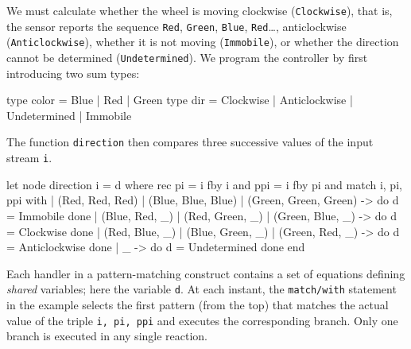 \documentclass[11pt,titlepage,twoside]{report}
\makeatletter
\newcommand{\zls}[1]{{\@span{class="zelusinline"}#1}}
\newcommand{\zls}[1]{\texttt{#1}}
\renewcommand{\zls}[1]{\texttt{#1}}
\makeatother
\begin{document}
We must calculate whether the wheel is moving clockwise (\zls{Clockwise}), 
that is, the sensor reports the sequence \zls{Red}, \zls{Green}, \zls{Blue}, 
\zls{Red}\ldots, anticlockwise (\zls{Anticlockwise}), whether it is not 
moving (\zls{Immobile}), or whether the direction cannot be determined 
(\zls{Undetermined}).
We program the controller by first introducing two sum types:
\begin{chklisting}
type color = Blue | Red | Green
type dir = Clockwise | Anticlockwise | Undetermined | Immobile
\end{chklisting}
The function \zls{direction} then compares three successive values of the 
input stream \zls{i}.
\begin{chklisting}
let node direction i = d where
  rec pi = i fby i
  and ppi = i fby pi
  and match i, pi, ppi  with
      | (Red, Red, Red) | (Blue, Blue, Blue) | (Green, Green, Green) ->
             do d = Immobile done
      | (Blue, Red, _) | (Red, Green, _) | (Green, Blue, _) ->
             do d = Clockwise done
      | (Red, Blue, _) | (Blue, Green, _) | (Green, Red, _) ->
             do d = Anticlockwise done
      | _ -> do d = Undetermined done
  end
\end{chklisting}

Each handler in a pattern-matching construct contains a set of
equations defining \emph{shared} variables; here the variable
\zls{d}.
At each instant, the \zls{match/with} statement in the example selects
the first pattern (from the top) that matches the actual value
of the triple \zls{i, pi, ppi} and executes the corresponding
branch.
Only one branch is executed in any single reaction.
\end{document}
